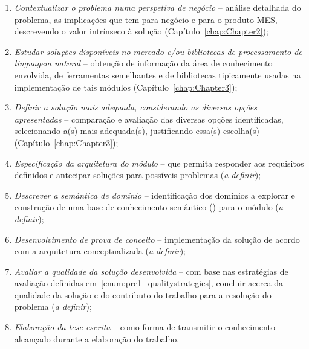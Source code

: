 \begin{enumerate}
    \item
    \label{enum:pre1_objectives_1}
    {
        \textit{Contextualizar o problema numa perspetiva de negócio} -- análise detalhada do problema, as implicações que tem para negócio e para o produto \gls{MES}, descrevendo o valor intrínseco à solução (Capítulo~\ref{chap:Chapter2});
    }
    \item
    \label{enum:pre1_objectives_2}
    {
        \textit{Estudar soluções disponíveis no mercado e/ou bibliotecas de processamento de linguagem natural} -- obtenção de informação da área de conhecimento envolvida, de ferramentas semelhantes e de bibliotecas tipicamente usadas na implementação de tais módulos (Capítulo~\ref{chap:Chapter3});
    }
    \item
    \label{enum:pre1_objectives_3}
    {
        \textit{Definir a solução mais adequada, considerando as diversas opções apresentadas} -- comparação e avaliação das diversas opções identificadas, selecionando a(s) mais adequada(s), justificando essa(s) escolha(s) (Capítulo~\ref{chap:Chapter3});
    }
    \item
    \label{enum:pre1_objectives_4}
    {
        \textit{Especificação da arquitetura do módulo} -- que permita responder aos requisitos definidos e antecipar soluções para possíveis problemas (\textit{a definir});
    }
    \item
    \label{enum:pre1_objectives_5}
    {
        \textit{Descrever a semântica de domínio} -- identificação dos domínios a explorar e construção de uma base de conhecimento semântico () para o módulo (\textit{a definir});
    }
    \item
    \label{enum:pre1_objectives_6}
    {
        \textit{Desenvolvimento de prova de conceito} -- implementação da solução de acordo com a arquitetura conceptualizada (\textit{a definir});
    }
    \item
    \label{enum:pre1_objectives_7}
    {
        \textit{Avaliar a qualidade da solução desenvolvida} -- com base nas estratégias de avaliação definidas em~\ref{enum:pre1_qualitystrategies}, concluir acerca da qualidade da solução e do contributo do trabalho para a resolução do problema (\textit{a definir});
    }
    \item
    \label{enum:pre1_objectives_8}
    {
        \textit{Elaboração da tese escrita} -- como forma de transmitir o conhecimento alcançado durante a elaboração do trabalho.
    }
\end{enumerate}

